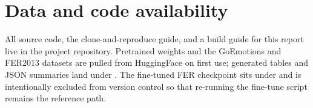 \documentclass[sigconf,nonacm]{acmart}
\begin{document}
  \section*{Data and code availability}
  All source code, the  clone-and-reproduce guide, and a build guide for this report live in the project repository. Pretrained weights and the GoEmotions and FER2013 datasets are pulled from HuggingFace on first use; generated tables and JSON summaries land under . The fine-tuned FER checkpoint sits under  and is intentionally excluded from version control so that re-running the fine-tune script remains the reference path.

  \balance
  
  

  
\end{document}
